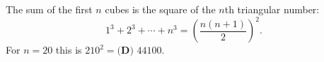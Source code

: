 The sum of the first $n$ cubes is the square of the $n$th triangular number:
\[1^3+2^3+\cdots+n^3=\left(\dfrac{n(n+1)}{2}\right)^2.\]
For $n=20$ this is $210^2=\boxed{\textbf{(D) }44100}$.
